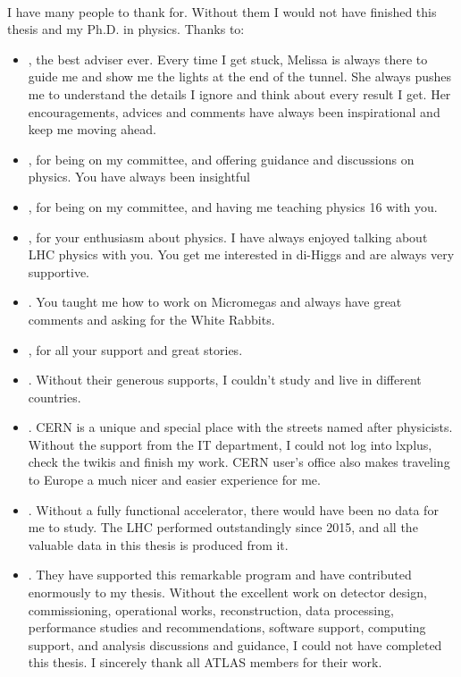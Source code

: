 
\paragraph{}
I have many people to thank for. Without them I would not have finished this thesis and my Ph.D. in physics. Thanks to:
\begin{itemize}
	\item {}, the best adviser ever. Every time I get stuck, Melissa is always there to guide me and show me the lights at the end of the tunnel. She always pushes me to understand the details I ignore and think about every result I get. Her encouragements, advices and comments have always been inspirational and keep me moving ahead.
	\item {}, for being on my committee, and offering guidance and discussions on physics. You have always been insightful
	\item {}, for being on my committee, and having me teaching physics 16 with you.
	\item {}, for your enthusiasm about physics. I have always enjoyed talking about LHC physics with you. You get me interested in di-Higgs and are always very supportive.
	\item {}. You taught me how to work on Micromegas and always have great comments and asking for the White Rabbits.
	\item {}, for all your support and great stories.
	\item {}. Without their generous supports, I couldn't study and live in different countries.
	\item {}. CERN is a unique and special place with the streets named after physicists. Without the support from the IT department, I could not log into lxplus, check the twikis and finish my work. CERN user's office also makes traveling to Europe a much nicer and easier experience for me.
	\item {}. Without a fully functional accelerator, there would have been no data for me to study. The LHC performed outstandingly since 2015, and all the valuable data in this thesis is produced from it. 
	\item {}. They have supported this remarkable program and have contributed enormously to my thesis. Without the excellent work on detector design, commissioning, operational works, reconstruction, data processing, performance studies and recommendations, software support, computing support, and analysis discussions and guidance, I could not have completed this thesis. I sincerely thank all ATLAS members for their work.

\end{itemize}
